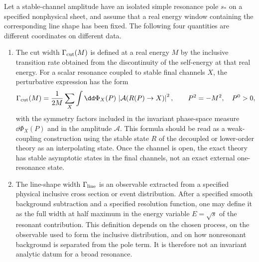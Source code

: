 \begin{definition}
\label{def:resonance-width-coordinates}
Let a stable-channel amplitude have an isolated simple resonance pole
\(s_\ast\) on a specified nonphysical sheet, and assume that a real energy
window containing the corresponding line shape has been fixed.  The following
four quantities are different coordinates on different data.

\begin{enumerate}
\item The cut width \(\Gamma_{\rm cut}(M)\) is defined at a real energy \(M\)
by the inclusive transition rate obtained from the discontinuity of the
self-energy at that real energy.  For a scalar resonance coupled to stable
final channels \(X\), the perturbative expression has the form
\[
  \Gamma_{\rm cut}(M)
  =
  \frac{1}{2M}
  \sum_X
  \int \dd\Phi_X(P)\,
  \left|\mathcal A(R(P)\to X)\right|^2 ,
  \qquad P^2=-M^2,\quad P^0>0,
\]
with the symmetry factors included in the invariant phase-space measure
\(\dd\Phi_X(P)\) and in the amplitude \(\mathcal A\).  This formula should be
read as a weak-coupling construction using the stable state \(R\) of the
decoupled or lower-order theory as an interpolating state.  Once the channel is
open, the exact theory has stable asymptotic states in the final channels, not
an exact external one-resonance state.

\item The line-shape width \(\Gamma_{\rm line}\) is an observable extracted
from a specified physical inclusive cross section or event distribution.  After a
specified smooth background subtraction and a specified resolution function,
one may define it as the full width at half maximum in the energy variable
\(E=\sqrt{s}\) of the resonant contribution.  This definition depends on the
chosen process, on the observable used to form the inclusive distribution, and
on how nonresonant background is separated from the pole term.  It is therefore
not an invariant analytic datum for a broad resonance.


\end{enumerate}
\end{definition}
